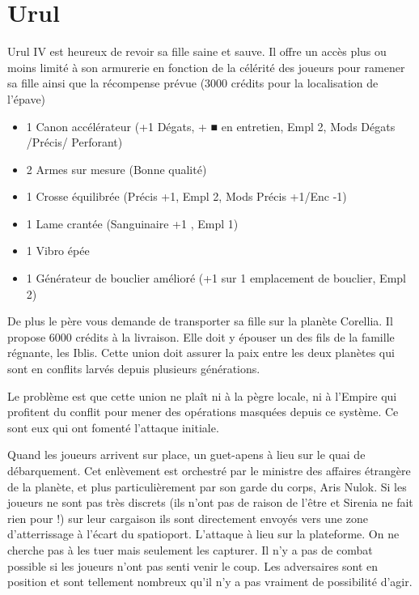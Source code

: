 \documentclass[a4paper,10pt,twoside,twocolumn,openany]{book}
\begin{document}
\section{Urul}

Urul IV est heureux de revoir sa fille saine et sauve. Il offre un accès plus ou moins limité à son
armurerie en fonction de la célérité des joueurs pour ramener sa fille ainsi que la récompense
prévue (3000 crédits pour la localisation de l’épave)

\begin{itemize}
\item 1 Canon accélérateur (+1 Dégats, + ■ en entretien, Empl 2, Mods Dégats /Précis/ Perforant)
\item 2 Armes sur mesure (Bonne qualité)
\item 1 Crosse équilibrée (Précis +1, Empl 2, Mods Précis +1/Enc -1)
\item 1 Lame crantée (Sanguinaire +1 , Empl 1)
\item 1 Vibro épée
\item 1 Générateur de bouclier amélioré (+1 sur 1 emplacement de bouclier, Empl 2)
\end{itemize}


De plus le père vous demande de transporter sa fille sur la planète Corellia. Il propose 6000
crédits à la livraison. Elle doit y épouser un des fils de la famille régnante, les Iblis. Cette union
doit assurer la paix entre les deux planètes qui sont en conflits larvés depuis plusieurs
générations.

Le problème est que cette union ne plaît ni à la pègre locale, ni à l'Empire qui profitent du conflit
pour mener des opérations masquées depuis ce système. Ce sont eux qui ont fomenté l'attaque
initiale.

Quand les joueurs arrivent sur place, un guet-apens à lieu sur le quai de débarquement. Cet
enlèvement est orchestré par le ministre des affaires étrangère de la planète, et plus
particulièrement par son garde du corps, Aris Nulok. Si les joueurs ne sont pas très discrets (ils
n’ont pas de raison de l’être et Sirenia ne fait rien pour !) sur leur cargaison ils sont directement
envoyés vers une zone d’atterrissage à l’écart du spatioport. L’attaque à lieu sur la plateforme.
On ne cherche pas à les tuer mais seulement les capturer. Il n’y a pas de combat possible si les
joueurs n’ont pas senti venir le coup. Les adversaires sont en position et sont tellement
nombreux qu'il n’y a pas vraiment de possibilité d’agir.
\end{document}
